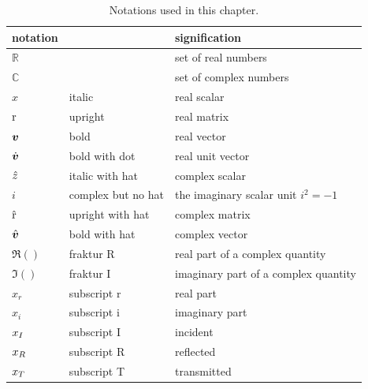 \begin{table}[b]
    \centering
    \begin{tabular}{lll}
        \toprule
        notation     & & signification \\
        \midrule
        $\mathbb{R}$ &                    & set of real numbers\\
        $\mathbb{C}$ &                    & set of complex numbers\\        
        $x$          & italic             & real scalar\\
        $\mathrm{r}$   & upright            & real matrix\\
        $\bm{v}$   & bold               & real vector\\
        $\dot{\bm{v}}$  & bold with dot      & real unit vector\\
        $\hat{z}$     & italic with hat    & complex scalar\\
        $i$          & complex but no hat & the imaginary scalar unit $i^2=-1$\\
        $\hat{\mathrm{r}}$ & upright with hat   & complex matrix \\
        $\hat{\bm{v}}$ & bold with hat      & complex vector \\
        $\Re()$      & fraktur R          & real part of a complex quantity \\
        $\Im()$      & fraktur I          & imaginary part of a complex quantity \\
        $x_r$        & subscript r        & real part \\
        $x_i$        & subscript i        & imaginary part \\
        $x_I$       & subscript I        & incident \\
        $x_R$       & subscript R        & reflected \\
        $x_T$       & subscript T        & transmitted \\
        \bottomrule        
    \end{tabular}
    \caption{Notations used in this chapter.}
    \label{tab:notations}
\end{table}

